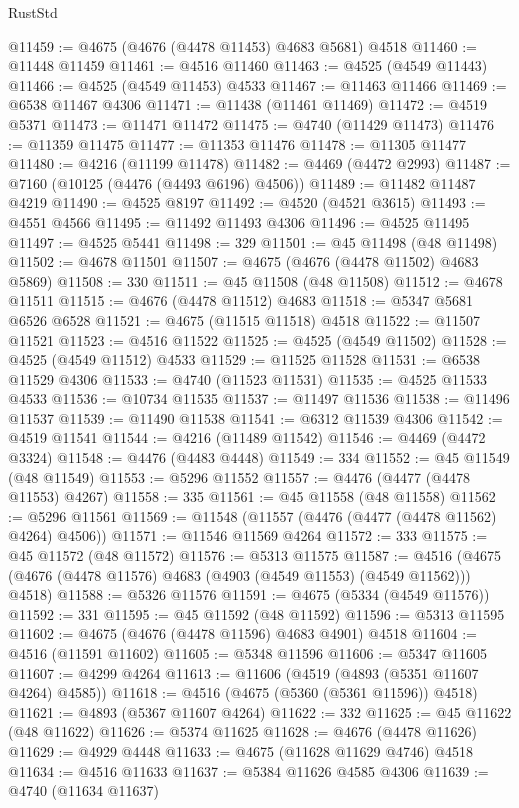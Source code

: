 \begin{lexlean}{RustStd}
\begin{coremodule}
{\begin{coremodule}
{{{{{{{{{{{{{{{{{{{{{{{{{{{{{{{{{{{{{{{{{{{{{{{{{{{{{{{{{{{{@11459 := @4675 (@4676 (@4478 @11453) @4683 @5681) @4518
@11460 := @11448 @11459
@11461 := @4516 @11460
@11463 := @4525 (@4549 @11443)
@11466 := @4525 (@4549 @11453) @4533
@11467 := @11463 @11466
@11469 := @6538 @11467 @4306
@11471 := @11438 (@11461 @11469)
@11472 := @4519 @5371
@11473 := @11471 @11472
@11475 := @4740 (@11429 @11473)
@11476 := @11359 @11475
@11477 := @11353 @11476
@11478 := @11305 @11477
@11480 := @4216 (@11199 @11478)
@11482 := @4469 (@4472 @2993)
@11487 := @7160 (@10125 (@4476 (@4493 @6196) @4506))
@11489 := @11482 @11487 @4219
@11490 := @4525 @8197
@11492 := @4520 (@4521 @3615)
@11493 := @4551 @4566
@11495 := @11492 @11493 @4306
@11496 := @4525 @11495
@11497 := @4525 @5441
@11498 := 329
@11501 := @45 @11498 (@48 @11498)
@11502 := @4678 @11501
@11507 := @4675 (@4676 (@4478 @11502) @4683 @5869)
@11508 := 330
@11511 := @45 @11508 (@48 @11508)
@11512 := @4678 @11511
@11515 := @4676 (@4478 @11512) @4683
@11518 := @5347 @5681 @6526 @6528
@11521 := @4675 (@11515 @11518) @4518
@11522 := @11507 @11521
@11523 := @4516 @11522
@11525 := @4525 (@4549 @11502)
@11528 := @4525 (@4549 @11512) @4533
@11529 := @11525 @11528
@11531 := @6538 @11529 @4306
@11533 := @4740 (@11523 @11531)
@11535 := @4525 @11533 @4533
@11536 := @10734 @11535
@11537 := @11497 @11536
@11538 := @11496 @11537
@11539 := @11490 @11538
@11541 := @6312 @11539 @4306
@11542 := @4519 @11541
@11544 := @4216 (@11489 @11542)
@11546 := @4469 (@4472 @3324)
@11548 := @4476 (@4483 @4448)
@11549 := 334
@11552 := @45 @11549 (@48 @11549)
@11553 := @5296 @11552
@11557 := @4476 (@4477 (@4478 @11553) @4267)
@11558 := 335
@11561 := @45 @11558 (@48 @11558)
@11562 := @5296 @11561
@11569 := @11548 (@11557 (@4476 (@4477 (@4478 @11562) @4264) @4506))
@11571 := @11546 @11569 @4264
@11572 := 333
@11575 := @45 @11572 (@48 @11572)
@11576 := @5313 @11575
@11587 := @4516 (@4675 (@4676 (@4478 @11576) @4683 (@4903 (@4549 @11553) (@4549 @11562))) @4518)
@11588 := @5326 @11576
@11591 := @4675 (@5334 (@4549 @11576))
@11592 := 331
@11595 := @45 @11592 (@48 @11592)
@11596 := @5313 @11595
@11602 := @4675 (@4676 (@4478 @11596) @4683 @4901) @4518
@11604 := @4516 (@11591 @11602)
@11605 := @5348 @11596
@11606 := @5347 @11605
@11607 := @4299 @4264
@11613 := @11606 (@4519 (@4893 (@5351 @11607 @4264) @4585))
@11618 := @4516 (@4675 (@5360 (@5361 @11596)) @4518)
@11621 := @4893 (@5367 @11607 @4264)
@11622 := 332
@11625 := @45 @11622 (@48 @11622)
@11626 := @5374 @11625
@11628 := @4676 (@4478 @11626)
@11629 := @4929 @4448
@11633 := @4675 (@11628 @11629 @4746) @4518
@11634 := @4516 @11633
@11637 := @5384 @11626 @4585 @4306
@11639 := @4740 (@11634 @11637)
}}}}}}}}}}}}}}}}}}}}}}}}}}}}}}}}}}}}}}}}}}}}}}}}}}}}}}}}}}}}
\end{coremodule}}
\end{coremodule}
\end{lexlean}
